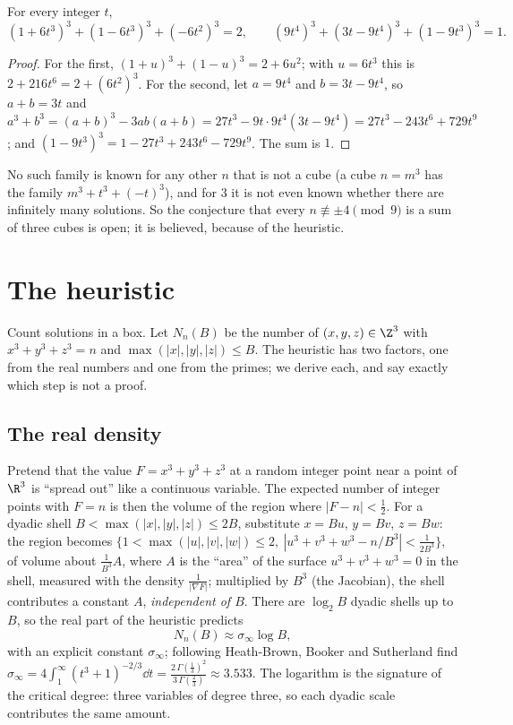 \begin{proposition}\label{prop:families}
For every integer $t$,
\[
(1+6t^3)^3+(1-6t^3)^3+(-6t^2)^3=2,\qquad(9t^4)^3+(3t-9t^4)^3+(1-9t^3)^3=1.
\]
\end{proposition}

\begin{proof}
For the first, $(1+u)^3+(1-u)^3=2+6u^2$; with $u=6t^3$ this is $2+216t^6=2+(6t^2)^3$. For the second, let $a=9t^4$ and $b=3t-9t^4$, so $a+b=3t$ and
$a^3+b^3=(a+b)^3-3ab(a+b)=27t^3-9t\cdot9t^4(3t-9t^4)=27t^3-243t^6+729t^9$; and $(1-9t^3)^3=1-27t^3+243t^6-729t^9$. The sum is $1$.
\end{proof}

No such family is known for any other $n$ that is not a cube (a cube $n=m^3$ has the family $m^3+t^3+(-t)^3$), and for $3$ it is not even known whether there are infinitely many
solutions. So the conjecture that every $n\not\equiv\pm4\pmod9$ is a sum of three cubes is open; it is believed, because of the heuristic.

\section{The heuristic}

Count solutions in a box. Let $N_n(B)$ be the number of $(x,y,z)\in\Z^3$ with $x^3+y^3+z^3=n$ and $\max(|x|,|y|,|z|)\le B$. The heuristic has two factors, one from the real numbers and one from the
primes; we derive each, and say exactly which step is not a proof.

\subsection*{The real density}

Pretend that the value $F=x^3+y^3+z^3$ at a random integer point near a point of $\R^3$ is ``spread out'' like a continuous variable. The expected number of integer points with $F=n$ is then the
volume of the region where $|F-n|<\frac12$. For a dyadic shell $B<\max(|x|,|y|,|z|)\le2B$, substitute $x=Bu$, $y=Bv$, $z=Bw$: the region becomes $\{1<\max(|u|,|v|,|w|)\le2,\ |u^3+v^3+w^3-n/B^3|<\frac1{2B^3}\}$, of
volume about $\frac1{B^3}A$, where $A$ is the ``area'' of the surface $u^3+v^3+w^3=0$ in the shell, measured with the density $\frac1{|\nabla F|}$; multiplied by $B^3$ (the Jacobian), the shell
contributes a constant $A$, \emph{independent of $B$}. There are $\log_2B$ dyadic shells up to $B$, so the real part of the heuristic predicts
\[
N_n(B)\approx\sigma_\infty\log B,
\]
with an explicit constant $\sigma_\infty$; following Heath-Brown, Booker and Sutherland find $\sigma_\infty=4\int_1^\infty(t^3+1)^{-2/3}\dd t=\frac{2\,\Gamma(\frac13)^2}{3\,\Gamma(\frac23)}\approx3.533$. The logarithm is the signature of the critical degree: three variables of degree three, so each dyadic scale contributes the same amount.

